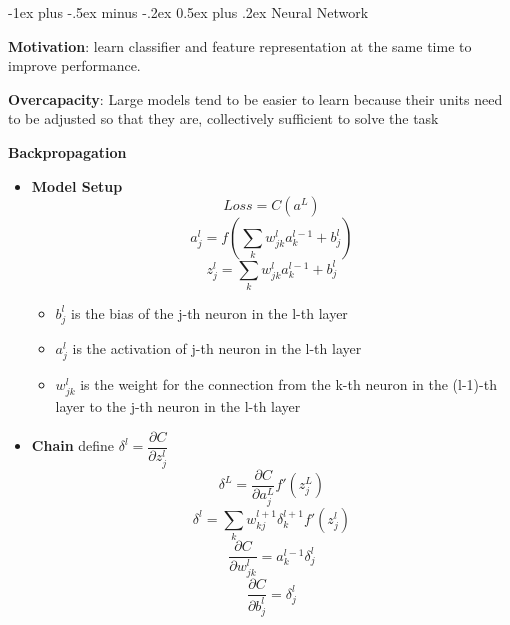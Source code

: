 \documentclass[a4paper, 10pt,landscape]{article}
\makeatletter
\renewcommand{\section}{\@startsection{section}{1}{0mm}%
                                {-1ex plus -.5ex minus -.2ex}%
                                {0.5ex plus .2ex}%
                                {\normalfont\large\bfseries}}
\makeatother
\begin{document}
\raggedright
\footnotesize
\begin{multicols*}{3}

\setlength{\premulticols}{1pt}
\setlength{\postmulticols}{1pt}
\setlength{\multicolsep}{1pt}
\setlength{\columnsep}{2pt}


\section{Neural Network}
\begin{description}
	\item {\bf Motivation}: learn classifier and feature representation at the same time to improve performance. 
	\item {\bf Overcapacity}: Large models tend to be easier to learn because their units need to be adjusted so that they are, collectively sufficient to solve the task
	\item {\bf Backpropagation}~
		\begin{itemize}
			\item {\bf Model Setup}~
				$$Loss = C(a^L)$$
				$$a_j^l = f(\sum_k w_{jk}^l a_k^{l-1} + b_j^l)$$
				$$z_j^{l} = \sum_k w_{jk}^{l} a_k^{l-1} + b_j^l$$
					\begin{itemize}
						\item $b_j^l$ is the bias of the j-th neuron in the l-th layer
						\item $a_j^l$ is the activation of j-th neuron in the l-th layer
						\item $w_{jk}^l$ is the weight for the connection from the k-th neuron in the (l-1)-th layer to the j-th neuron in the l-th layer
					\end{itemize}
			\item {\bf Chain} define $\delta^l = \dfrac{\partial C}{\partial z_j^l}$
				$$\delta^{L} = \dfrac{\partial C}{\partial a_j^L}f'(z_j^L)$$
				$$\delta^l = \sum_k w_{kj}^{l+1}\delta_k^{l+1}f'(z_j^l)$$
				$$\dfrac{\partial C}{\partial w_{jk}^l} = a_k^{l-1} \delta_j^l$$
				$$\dfrac{\partial C}{\partial b_j^l} = \delta_j^l$$

		\end{itemize}
\end{description}


\end{multicols*}
\end{document}
